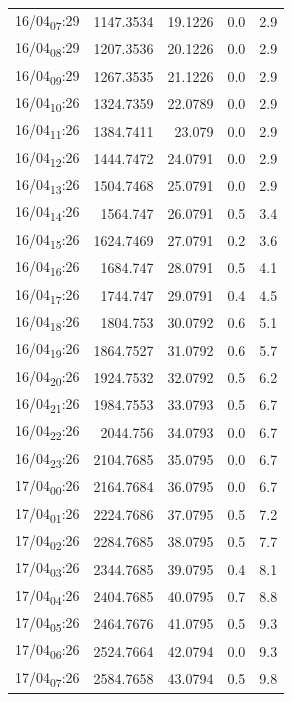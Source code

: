 \documentclass[11pt]{article}
\begin{document}
\begin{center}
\begin{tabular}{lrrrr}
16/04\textsubscript{07}:29 & 1147.3534 & 19.1226 & 0.0 & 2.9\\[0pt]
16/04\textsubscript{08}:29 & 1207.3536 & 20.1226 & 0.0 & 2.9\\[0pt]
16/04\textsubscript{09}:29 & 1267.3535 & 21.1226 & 0.0 & 2.9\\[0pt]
16/04\textsubscript{10}:26 & 1324.7359 & 22.0789 & 0.0 & 2.9\\[0pt]
16/04\textsubscript{11}:26 & 1384.7411 & 23.079 & 0.0 & 2.9\\[0pt]
16/04\textsubscript{12}:26 & 1444.7472 & 24.0791 & 0.0 & 2.9\\[0pt]
16/04\textsubscript{13}:26 & 1504.7468 & 25.0791 & 0.0 & 2.9\\[0pt]
16/04\textsubscript{14}:26 & 1564.747 & 26.0791 & 0.5 & 3.4\\[0pt]
16/04\textsubscript{15}:26 & 1624.7469 & 27.0791 & 0.2 & 3.6\\[0pt]
16/04\textsubscript{16}:26 & 1684.747 & 28.0791 & 0.5 & 4.1\\[0pt]
16/04\textsubscript{17}:26 & 1744.747 & 29.0791 & 0.4 & 4.5\\[0pt]
16/04\textsubscript{18}:26 & 1804.753 & 30.0792 & 0.6 & 5.1\\[0pt]
16/04\textsubscript{19}:26 & 1864.7527 & 31.0792 & 0.6 & 5.7\\[0pt]
16/04\textsubscript{20}:26 & 1924.7532 & 32.0792 & 0.5 & 6.2\\[0pt]
16/04\textsubscript{21}:26 & 1984.7553 & 33.0793 & 0.5 & 6.7\\[0pt]
16/04\textsubscript{22}:26 & 2044.756 & 34.0793 & 0.0 & 6.7\\[0pt]
16/04\textsubscript{23}:26 & 2104.7685 & 35.0795 & 0.0 & 6.7\\[0pt]
17/04\textsubscript{00}:26 & 2164.7684 & 36.0795 & 0.0 & 6.7\\[0pt]
17/04\textsubscript{01}:26 & 2224.7686 & 37.0795 & 0.5 & 7.2\\[0pt]
17/04\textsubscript{02}:26 & 2284.7685 & 38.0795 & 0.5 & 7.7\\[0pt]
17/04\textsubscript{03}:26 & 2344.7685 & 39.0795 & 0.4 & 8.1\\[0pt]
17/04\textsubscript{04}:26 & 2404.7685 & 40.0795 & 0.7 & 8.8\\[0pt]
17/04\textsubscript{05}:26 & 2464.7676 & 41.0795 & 0.5 & 9.3\\[0pt]
17/04\textsubscript{06}:26 & 2524.7664 & 42.0794 & 0.0 & 9.3\\[0pt]
17/04\textsubscript{07}:26 & 2584.7658 & 43.0794 & 0.5 & 9.8\\[0pt]

\end{tabular}
\end{center}
\end{document}
